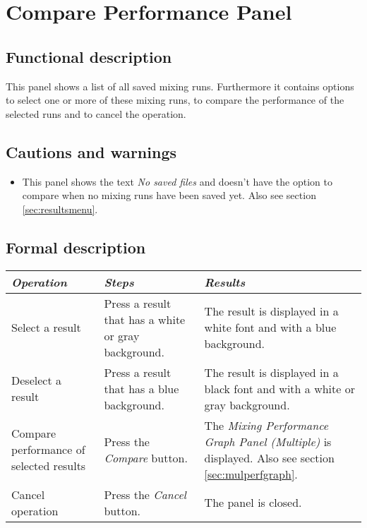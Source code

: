 \section{Compare Performance Panel}
\label{sec:compareperf}
  \subsection*{Functional description}
  This panel shows a list of all saved mixing runs. Furthermore it contains options to select one or more of these mixing runs, to compare the  performance of the selected runs and to cancel the operation.

  \subsection*{Cautions and warnings}
  \begin{itemize}
  \item This panel shows the text \emph{No saved files} and doesn't have the option to compare when no mixing runs have been saved yet. Also see section \ref{sec:resultsmenu}.
  \end{itemize}

  \subsection*{Formal description}
    \begin{tabularx}{\textwidth}{XXX}
    \toprule
    \emph{Operation} & \emph{Steps} & \emph{Results} \\
    \midrule
    Select a result & Press a result that has a white or gray background. & The result is displayed in a white font and with a blue background. \\
    \midrule
    Deselect a result & Press a result that has a blue background. & The result is displayed in a black font and with a white or gray background. \\
    \midrule
    Compare performance of selected results & Press the \emph{Compare} button. & The \emph{Mixing Performance Graph Panel (Multiple)} is displayed. Also see section \ref{sec:mulperfgraph}. \\
    \midrule
    Cancel operation & Press the \emph{Cancel} button. & The panel is closed. \\
    \bottomrule
\end{tabularx}

